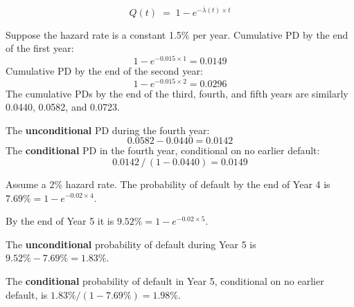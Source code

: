 \begin{crfmlbox}
\[ Q(t) \;=\; 1 - e^{-\bar{\lambda}(t)\times t} \]
\end{crfmlbox}

\begin{crexbox}
Suppose the hazard rate is a constant 1.5\% per year.
\tcblower
Cumulative PD by the end of the first year:
\[ 1 - e^{-0.015 \times 1} = 0.0149 \]
Cumulative PD by the end of the second year:
\[ 1 - e^{-0.015 \times 2} = 0.0296 \]
The cumulative PDs by the end of the third, fourth, and fifth years are similarly
0.0440, 0.0582, and 0.0723.

\smallskip
The \textbf{unconditional} PD during the fourth year:
\[ 0.0582 - 0.0440 = 0.0142 \]
The \textbf{conditional} PD in the fourth year, conditional on no earlier default:
\[ 0.0142 \,/\, (1 - 0.0440) = 0.0149 \]
\end{crexbox}

\begin{crexbox}
Assume a 2\% hazard rate.
\tcblower
The probability of default by the end of Year 4 is $7.69\% = 1 - e^{-0.02\times4}$.

By the end of Year 5 it is $9.52\% = 1 - e^{-0.02\times5}$.

The \textbf{unconditional} probability of default during Year 5 is
$9.52\% - 7.69\% = 1.83\%$.

The \textbf{conditional} probability of default in Year 5, conditional on no
earlier default, is $1.83\% / (1 - 7.69\%) = 1.98\%$.
\end{crexbox}

